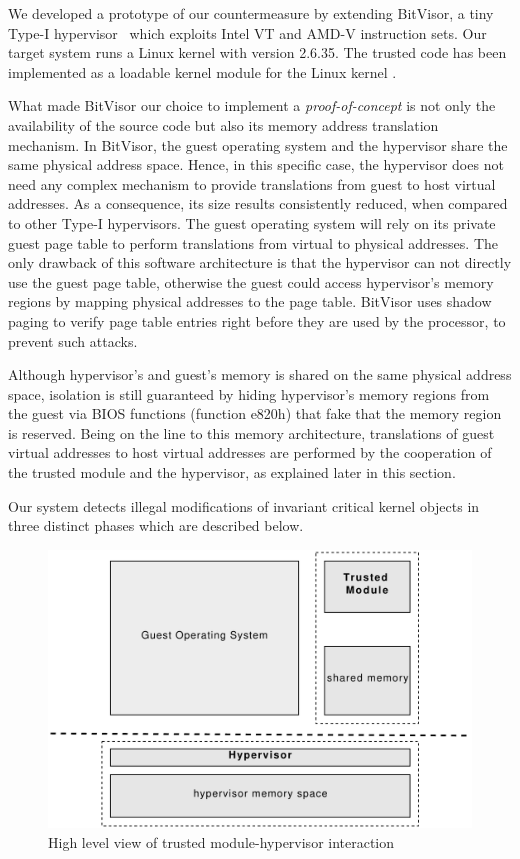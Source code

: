 We developed a prototype of our countermeasure by extending BitVisor, a tiny Type-I hypervisor~\cite{1508311} which exploits Intel VT and AMD-V instruction sets. Our target system runs a Linux kernel with version 2.6.35. The trusted code has been implemented as a loadable kernel module for the Linux kernel \cite{linuxdevicedrivers}.
 
What made BitVisor our choice to implement a \emph{proof-of-concept} is not only the availability of the source code but also its memory address translation mechanism. In BitVisor, the guest operating system and the hypervisor share the same physical address space. Hence, in this specific case, the hypervisor does not need any complex mechanism to provide translations from guest to host virtual addresses. As a consequence, its size results consistently reduced, when compared to other Type-I hypervisors.  
The guest operating system will rely on its private guest page table to perform translations from virtual to physical addresses. The only drawback of this software architecture is that the hypervisor can not directly use the guest page table, otherwise the guest could access hypervisor's memory regions by mapping physical addresses to the page table. BitVisor uses shadow paging to verify page table entries right before they are used by the processor, to prevent such attacks.
 
Although hypervisor's and guest's memory is shared on the same physical address space, isolation is still guaranteed by hiding hypervisor's memory regions from the guest via BIOS functions (function e820h) that fake that the memory region is reserved. 
Being on the line to this memory architecture, translations of guest virtual addresses to host virtual addresses are performed by the cooperation of the trusted module and the hypervisor, as explained later in this section. 


Our system detects illegal modifications of invariant critical kernel objects in three distinct phases which are described below.


\begin{figure}[htbp] 
\begin{center}
\includegraphics[scale=0.6]{images/schema_tm_hyperv.pdf}
\caption{{High level view of trusted module-hypervisor interaction}}
\label{schema_tm_hyperv}
\end{center}
\end{figure}


